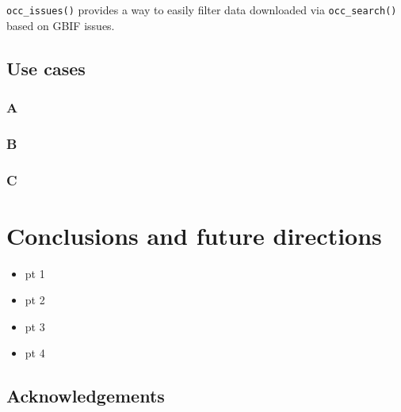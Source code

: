 \documentclass[author-year, review, 11pt]{components/elsarticle} %
\newenvironment{Shaded}{\begin{snugshade}}{\end{snugshade}}
\newcommand{\KeywordTok}[1]{\textcolor[rgb]{0.13,0.29,0.53}{\textbf{{#1}}}}
\newcommand{\DataTypeTok}[1]{\textcolor[rgb]{0.13,0.29,0.53}{{#1}}}
\newcommand{\DecValTok}[1]{\textcolor[rgb]{0.00,0.00,0.81}{{#1}}}
\newcommand{\StringTok}[1]{\textcolor[rgb]{0.31,0.60,0.02}{{#1}}}
\newcommand{\CommentTok}[1]{\textcolor[rgb]{0.56,0.35,0.01}{\textit{{#1}}}}
\newcommand{\NormalTok}[1]{{#1}}
\begin{document}
\texttt{occ\_issues()} provides a way to easily filter data downloaded
via \texttt{occ\_search()} based on GBIF issues.

\begin{Shaded}
\end{Shaded}

\subsection{Use cases}\label{use-cases}

\subsubsection{A}\label{a}

\subsubsection{B}\label{b}

\subsubsection{C}\label{c}

\section{Conclusions and future
directions}\label{conclusions-and-future-directions}

\begin{itemize}
\itemsep1pt\parskip0pt
\item
  pt 1
\item
  pt 2
\item
  pt 3
\item
  pt 4
\end{itemize}

\subsection{Acknowledgements}\label{acknowledgements}
\end{document}
